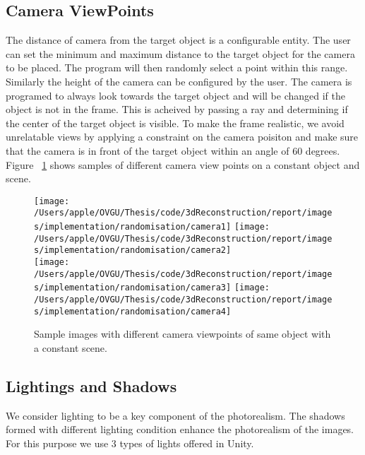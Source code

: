 \subsection{Camera ViewPoints}

The distance of camera from the target object is a configurable entity.
The user can set the minimum and maximum distance to the target object for the camera to be placed.
The program will then randomly select a point within this range.
Similarly the height of the camera can be configured by the user.
The camera is programed to always look towards the target object and will be changed if the object is not in the frame.
This is acheived by passing a ray and determining if the center of the target object is visible.
To make the frame realistic, we avoid unrelatable views by applying a constraint on the camera poisiton and make sure that the camera is in front of the target object within an angle of 60 degrees.
Figure ~\ref{fig:Camera viewpoints} shows samples of different camera view points on a constant object and scene.

\begin{figure}
    \centering
    \texttt{[image: /Users/apple/OVGU/Thesis/code/3dReconstruction/report/images/implementation/randomisation/camera1]}
    \texttt{[image: /Users/apple/OVGU/Thesis/code/3dReconstruction/report/images/implementation/randomisation/camera2]}\\
    \vspace{0.1cm}
    \texttt{[image: /Users/apple/OVGU/Thesis/code/3dReconstruction/report/images/implementation/randomisation/camera3]}
    \texttt{[image: /Users/apple/OVGU/Thesis/code/3dReconstruction/report/images/implementation/randomisation/camera4]}\\
    \caption{Sample images with different camera viewpoints of same object with a constant scene.}
    \label{fig:Camera viewpoints}
\end{figure}

\subsection{Lightings and Shadows}

We consider lighting to be a key component of the photorealism.
The shadows formed with different lighting condition enhance the photorealism of the images.
For this purpose we use 3 types of lights offered in Unity.

